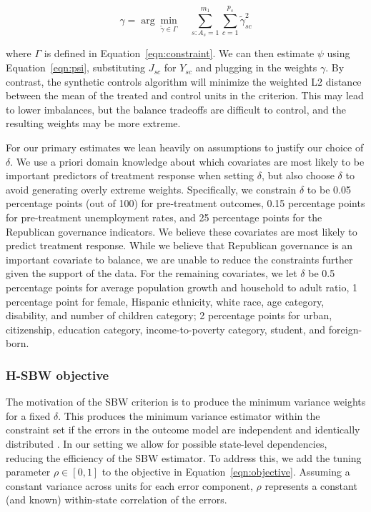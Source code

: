 \documentclass[aoas]{imsart}
\theoremstyle{plain}
\theoremstyle{remark}
\begin{document}
\begin{equation}
\gamma = \arg\min_{\tilde{\gamma} \in \Gamma} \quad \sum_{s: A_s = 1}^{m_1}\sum_{c = 1}^{p_s} \tilde{\gamma}_{sc}^2  
\end{equation}

where $\Gamma$ is defined in Equation~\ref{eqn:constraint}. We can then estimate $\psi$ using Equation~\ref{eqn:psi}, substituting $J_{sc}$ for $Y_{sc}$ and plugging in the weights $\gamma$. By contrast, the synthetic controls algorithm will minimize the weighted L2 distance between the mean of the treated and control units in the criterion. This may lead to lower imbalances, but the balance tradeoffs are difficult to control, and the resulting weights may be more extreme. 

For our primary estimates we lean heavily on assumptions to justify our choice of $\delta$. We use a priori domain knowledge about which covariates are most likely to be important predictors of treatment response when setting $\delta$, but also choose $\delta$ to avoid generating overly extreme weights. Specifically, we constrain $\delta$ to be 0.05 percentage points (out of 100) for pre-treatment outcomes, 0.15 percentage points for pre-treatment unemployment rates, and 25 percentage points for the Republican governance indicators. We believe these covariates are most likely to predict treatment response. While we believe that Republican governance is an important covariate to balance, we are unable to reduce the constraints further given the support of the data. For the remaining covariates, we let $\delta$ be 0.5 percentage points for average population growth and household to adult ratio, 1 percentage point for female, Hispanic ethnicity, white race, age category, disability, and number of children category; 2 percentage points for urban, citizenship, education category, income-to-poverty category, student, and foreign-born.

\subsubsection{H-SBW objective}

The motivation of the SBW criterion is to produce the minimum variance weights for a fixed $\delta$. This produces the minimum variance estimator within the constraint set if the errors in the outcome model are independent and identically distributed \cite{zubizarreta2015stable}. In our setting we allow for possible state-level dependencies, reducing the efficiency of the SBW estimator. To address this, we add the tuning parameter $\rho \in [0, 1]$ to the objective in Equation~\ref{eqn:objective}. Assuming a constant variance across units for each error component, $\rho$ represents a constant (and known) within-state correlation of the errors. 
\end{document}
